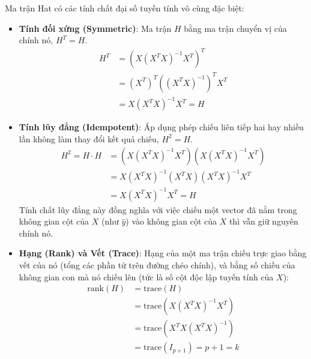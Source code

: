 Ma trận Hat có các tính chất đại số tuyến tính vô cùng đặc biệt:
\begin{itemize}
    \item \textbf{Tính đối xứng (Symmetric)}: Ma trận $H$ bằng ma trận chuyển vị của chính nó, $H^T = H$.
    \begin{equation}
    \begin{split}
        H^T &= \left( X (X^T X)^{-1} X^T \right)^T \\
        &= (X^T)^T \left( (X^T X)^{-1} \right)^T X^T \\
        &= X (X^T X)^{-1} X^T = H
    \end{split}
    \end{equation}
    
    \item \textbf{Tính lũy đẳng (Idempotent)}: Áp dụng phép chiếu liên tiếp hai hay nhiều lần không làm thay đổi kết quả chiếu, $H^2 = H$.
    \begin{equation}
    \begin{split}
        H^2 = H \cdot H &= \left( X (X^T X)^{-1} X^T \right) \left( X (X^T X)^{-1} X^T \right) \\
        &= X (X^T X)^{-1} (X^T X) (X^T X)^{-1} X^T \\
        &= X (X^T X)^{-1} X^T = H
    \end{split}
    \end{equation}
    Tính chất lũy đẳng này đồng nghĩa với việc chiếu một vector đã nằm trong không gian cột của $X$ (như $\hat{y}$) vào không gian cột của $X$ thì vẫn giữ nguyên chính nó.
    
    \item \textbf{Hạng (Rank) và Vết (Trace)}: Hạng của một ma trận chiếu trực giao bằng vết của nó (tổng các phần tử trên đường chéo chính), và bằng số chiều của không gian con mà nó chiếu lên (tức là số cột độc lập tuyến tính của $X$):
    \begin{equation}
    \begin{split}
        \text{rank}(H) &= \text{trace}(H) \\
        &= \text{trace}\left( X (X^T X)^{-1} X^T \right) \\
        &= \text{trace}\left( X^T X (X^T X)^{-1} \right) \\
        &= \text{trace}(I_{p+1}) = p + 1 = k
    \end{split}
    \end{equation}
    

\end{itemize}
